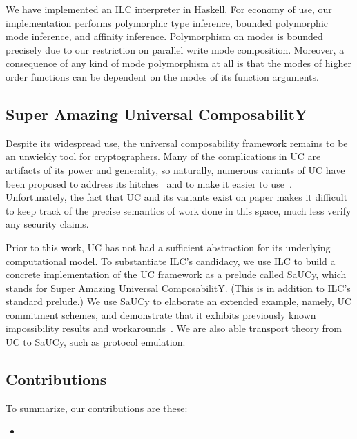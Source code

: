 We have implemented an ILC interpreter in Haskell. For economy of use, our
implementation performs polymorphic type inference, bounded polymorphic mode
inference, and  affinity inference. Polymorphism on modes is bounded
precisely due to our restriction on parallel write mode composition. Moreover, a
consequence of any kind of mode polymorphism at all is that the modes of higher
order functions can be dependent on the modes of its function arguments.

\subsection{Super Amazing Universal ComposabilitY}

 Despite its widespread use, the universal
composability framework remains to be an unwieldy tool for cryptographers. Many
of the complications in UC are artifacts of its power and generality, so
naturally, numerous variants of UC have been proposed to address its
hitches~\cite{backes2007reactive, hofheinz2015gnuc, canetti2007universally,
  canetti2003universal} and to make it easier to
use~\cite{canetti2015simpler}. Unfortunately, the fact that UC and its variants
exist on paper makes it difficult to keep track of the precise semantics of work
done in this space, much less verify any security claims.

Prior to this work, UC has not had a sufficient abstraction for its underlying
computational model. To substantiate ILC's candidacy, we use ILC to build a
concrete implementation of the UC framework as a prelude called SaUCy, which
stands for Super Amazing Universal ComposabilitY. (This is in addition to ILC's
standard prelude.) We use SaUCy to elaborate an extended example, namely, UC
commitment schemes, and demonstrate that it exhibits previously known
impossibility results and workarounds~\cite{canetti2001commitments}. We are also
able transport theory from UC to SaUCy, such as protocol emulation.

\subsection{Contributions}
\label{subsec:contributions}

To summarize, our contributions are these:

\begin{itemize}[leftmargin=*]
  \item 
\end{itemize}
